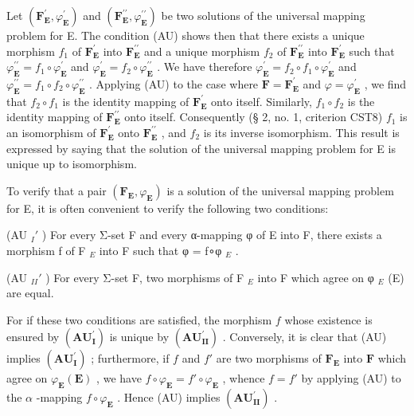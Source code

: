 Let \((\mathbf{F}_{\mathbf{E}}^{\prime},\varphi_{\mathbf{E}}^{\prime})\) and \((\mathbf{F}_{\mathbf{E}}^{\prime \prime},\varphi_{\mathbf{E}}^{\prime \prime})\) be two solutions of the universal mapping problem for E. The condition (AU) shows then that there exists a unique morphism \(f_{1}\) of \(\mathbf{F}_{\mathbf{E}}^{\prime}\) into \(\mathbf{F}_{\mathbf{E}}^{\prime \prime}\) and a unique morphism \(f_{2}\) of \(\mathbf{F}_{\mathbf{E}}^{\prime \prime}\) into \(\mathbf{F}_{\mathbf{E}}^{\prime}\) such that \(\varphi_{\mathbf{E}}^{\prime \prime} = f_{1}\circ \varphi_{\mathbf{E}}^{\prime}\) and \(\varphi_{\mathbf{E}}^{\prime} = f_{2}\circ \varphi_{\mathbf{E}}^{\prime \prime}\) . We have therefore \(\varphi_{\mathbf{E}}^{\prime} = f_{2}\circ f_{1}\circ \varphi_{\mathbf{E}}^{\prime}\) and \(\varphi_{\mathbf{E}}^{\prime \prime} = f_{1}\circ f_{2}\circ \varphi_{\mathbf{E}}^{\prime \prime}\) . Applying (AU) to the case where \(\mathbf{F} = \mathbf{F}_{\mathbf{E}}^{\prime}\) and \(\varphi = \varphi_{\mathbf{E}}^{\prime}\) , we find that \(f_{2}\circ f_{1}\) is the identity mapping of \(\mathbf{F}_{\mathbf{E}}^{\prime}\) onto itself. Similarly, \(f_{1}\circ f_{2}\) is the identity mapping of \(\mathbf{F}_{\mathbf{E}}^{\prime \prime}\) onto itself. Consequently (§ 2, no. 1, criterion CST8) \(f_{1}\) is an isomorphism of \(\mathbf{F}_{\mathbf{E}}^{\prime}\) onto \(\mathbf{F}_{\mathbf{E}}^{\prime \prime}\) , and \(f_{2}\) is its inverse isomorphism. This result is expressed by saying that the solution of the universal mapping problem for E is unique up to isomorphism.

To verify that a pair \((\mathbf{F}_{\mathbf{E}}, \varphi_{\mathbf{E}})\) is a solution of the universal mapping problem for E, it is often convenient to verify the following two conditions:

(AU \(_{I}'\) ) For every Σ-set F and every α-mapping φ of E into F, there exists a morphism f of F \(_{E}\) into F such that φ = f∘φ \(_{E}\) .

(AU \(_{II}'\) ) For every Σ-set F, two morphisms of F \(_{E}\) into F which agree on φ \(_{E}\) (E) are equal.

For if these two conditions are satisfied, the morphism \(f\) whose existence is ensured by \((\mathbf{AU}_{\mathbf{I}}^{\prime})\) is unique by \((\mathbf{AU}_{\mathbf{II}}^{\prime})\) . Conversely, it is clear that (AU) implies \((\mathbf{AU}_{\mathbf{I}}^{\prime})\) ; furthermore, if \(f\) and \(f'\) are two morphisms of \(\mathbf{F}_{\mathbf{E}}\) into \(\mathbf{F}\) which agree on \(\varphi_{\mathbf{E}}(\mathbf{E})\) , we have \(f \circ \varphi_{\mathbf{E}} = f' \circ \varphi_{\mathbf{E}}\) , whence \(f = f'\) by applying (AU) to the \(\alpha\) -mapping \(f \circ \varphi_{\mathbf{E}}\) . Hence (AU) implies \((\mathbf{AU}_{\mathbf{II}}^{\prime})\) .

